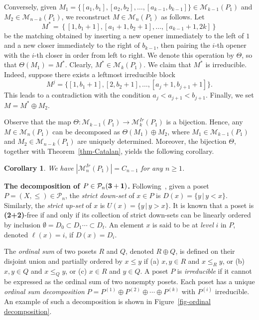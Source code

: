 \documentclass[11pt]{article}
\newtheorem{coro}[thm]{Corollary}
\newcommand{\PP}{{\mathcal P}}
\newcommand{\M}{\mathcal{M}}
\begin{document}
	Conversely, given $M_1 = \{[a_1, b_1], [a_2, b_2], \ldots, [a_{k-1}, b_{k-1}]\} \in \mathcal{M}_{k-1}(P_1)$ and $M_2 \in \mathcal{M}_{n-k}(P_1)$, we reconstruct $M \in \mathcal{M}_n(P_1)$ as follows.  
	Let
	\[
	M^* = \left\{ [ 1, b_1+1], [a_1+1, b_2+1], \ldots, [a_{k-1}+1, 2k] \right\}
	\]
	be the matching obtained by inserting a new opener immediately to the left of $1$ and a new closer immediately to the right of $b_{k-1}$, then pairing the $i$-th opener with the $i$-th closer in order from left to right. 
	We denote this operation by $\Theta$, so that $\Theta(M_1) = M^*$.  
	Clearly, $M^* \in \mathcal{M}_{k}(P_1)$. We claim that $M^*$ is irreducible.  Indeed, suppose there exists a leftmost irreducible block 
	\[
	M^j = \{[1, b_1+1], [2, b_2+1], \ldots, [a_j+1, b_{j+1}+1]\}.
	\] 
	This leads to a contradiction with the condition $a_j < a_{j+1} < b_{j+1}$.  Finally, we set $M = M^* \oplus M_2$.
	
	Observe that the map $\Theta : \mathcal{M}_{k-1}(P_1) \to \mathcal{M}^{Ir}_k(P_1)$ is a bijection.  
	Hence, any $M \in \mathcal{M}_n(P_1)$ can be decomposed as $\Theta(M_1) \oplus M_2$, where $M_1 \in \mathcal{M}_{k-1}(P_1)$ and $M_2 \in \mathcal{M}_{n-k}(P_1)$ are uniquely determined.  
	Moreover, the bijection $\Theta$, together with Theorem~\ref{thm-Catalan}, yields the following corollary.
	\begin{coro}\label{lem-P1-decomposition}
		We have $|\M_{n}^{Ir}(P_1)|=C_{n-1}$ for any $n\geq 1$. 
	\end{coro}
	
	\textbf{The decomposition of $P \in \PP_n\bf{(3+1)}$.} 
	Following~\cite{Bousquet-Claesson-Dukes-Kitaev}, given a poset \( P = (X, \le ) \in \mathcal{P}_n\), the \textit{strict down-set} of \( x \in P\) is  $D(x) = \{ y \, |\,   y < x \}$. Similarly, the \textit{strict up-set} of $x$ is $U(x)=\{y \, |\,  y > x\}$. 
	It is known that a poset is \textbf{(2+2)}-free if and only if its collection of strict down-sets can be linearly ordered by inclusion
	$\emptyset =D_0 \subset  D_1 \cdots \subset D_t$.
	An element \(x\) is said to be at \textit{level} \(i\) in \(P\), denoted \(\ell(x) = i\), if \(D(x) = D_i\). 
	
	The {\it ordinal sum} of two posets $R$ and $Q$, denoted $R \oplus Q$, is defined on their disjoint union and partially ordered by $x \le y$  if  (a) $x,y \in R$ and $x \le_R y$, or (b) $x,y \in Q$ and $x \le_Q y$, or (c) $x \in R$ and $y \in Q$.
	A poset $P$ is \emph{irreducible} if it cannot be expressed as the ordinal sum of two nonempty posets.
	Each poset has a unique {\it ordinal sum decomposition} $P=P^{(1)} \oplus P^{(2)} \oplus \cdots \oplus P^{(k)}$ with $P^{(i)}$ irreducible.
	An example of such a decomposition is shown in Figure~\ref{fig-ordinal decomposition}.
	
\end{document}
